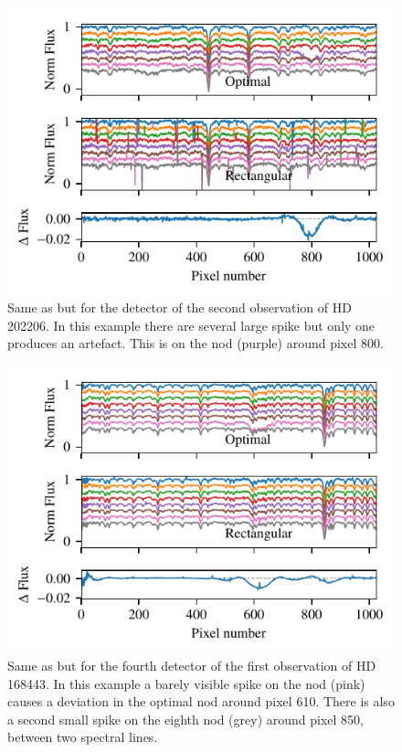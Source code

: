  \begin{figure}
    \centering
    \includegraphics[width=0.7\linewidth]{figures/appendix/bp_plots/extraction_comparision_HD202206-2_chip_1}
    \caption{Same as  but for the  detector of the second observation of {HD\,202206}. In this example there are several large spike but only one produces an artefact. This is on the  nod (purple) around pixel 800.}
    \label{fig:artefact_example4}
\end{figure}
 \begin{figure}
     \centering
     \includegraphics[width=0.7\linewidth]{figures/appendix/bp_plots/extraction_comparision_HD168443-1_chip_4}
     \caption{Same as  but for the fourth detector of the first observation of {HD\,168443}. In this example a barely visible spike on the   nod (pink) causes a deviation in the optimal nod around pixel 610. There is also a second small spike on the eighth  nod (grey) around pixel 850, between two spectral lines.}
     \label{fig:artefact_example5}
 \end{figure}
